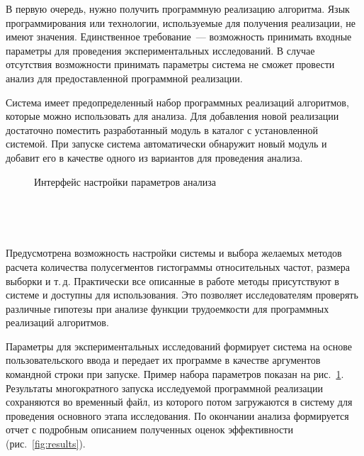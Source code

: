 \documentclass[a4paper, article, 14pt]{extarticle}
\begin{document}
В первую очередь, нужно получить программную реализацию алгоритма. Язык программирования или технологии, используемые для получения реализации, не имеют значения. Единственное требование~--- возможность принимать входные параметры для проведения экспериментальных исследований. В случае отсутствия возможности принимать параметры система не сможет провести анализ для предоставленной программной реализации.

Система имеет предопределенный набор программных реализаций алгоритмов, которые можно использовать для анализа. Для добавления новой реализации достаточно поместить разработанный модуль в каталог с установленной системой. При запуске система автоматически обнаружит новый модуль и добавит его в качестве одного из вариантов для проведения анализа.

\begin{figure}[h]
	\caption{Интерфейс настройки параметров анализа}
	\label{fig:interface}
\end{figure}

\

\

Предусмотрена возможность настройки системы и выбора желаемых методов расчета количества полусегментов гистограммы относительных частот, размера выборки и т.\,д. Практически все описанные в работе методы присутствуют в системе и доступны для использования. Это позволяет исследователям проверять различные гипотезы при анализе функции трудоемкости для программных реализаций алгоритмов.

Параметры для экспериментальных исследований формирует система на основе пользовательского ввода и передает их программе в качестве аргументов командной строки при запуске. Пример набора параметров показан на рис.~\ref{fig:interface}. Результаты многократного запуска исследуемой программной реализации сохраняются во временный файл, из которого потом загружаются в систему для проведения основного этапа исследования. По окончании анализа формируется отчет с подробным описанием полученных оценок эффективности (рис.~\ref{fig:results}).
\end{document}
